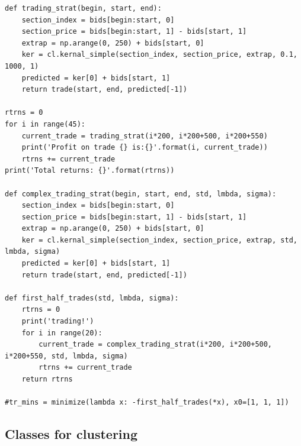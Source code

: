 \documentclass[a4paper]{article}
\begin{document}
\begin{verbatim}
def trading_strat(begin, start, end):
    section_index = bids[begin:start, 0]
    section_price = bids[begin:start, 1] - bids[start, 1]
    extrap = np.arange(0, 250) + bids[start, 0]
    ker = cl.kernal_simple(section_index, section_price, extrap, 0.1, 1000, 1)
    predicted = ker[0] + bids[start, 1]
    return trade(start, end, predicted[-1])

rtrns = 0
for i in range(45):
    current_trade = trading_strat(i*200, i*200+500, i*200+550)
    print('Profit on trade {} is:{}'.format(i, current_trade))
    rtrns += current_trade 
print('Total returns: {}'.format(rtrns))

def complex_trading_strat(begin, start, end, std, lmbda, sigma):
    section_index = bids[begin:start, 0]
    section_price = bids[begin:start, 1] - bids[start, 1]
    extrap = np.arange(0, 250) + bids[start, 0]
    ker = cl.kernal_simple(section_index, section_price, extrap, std, lmbda, sigma)
    predicted = ker[0] + bids[start, 1]
    return trade(start, end, predicted[-1])

def first_half_trades(std, lmbda, sigma):
    rtrns = 0
    print('trading!')
    for i in range(20):
        current_trade = complex_trading_strat(i*200, i*200+500, i*200+550, std, lmbda, sigma)
        rtrns += current_trade
    return rtrns

#tr_mins = minimize(lambda x: -first_half_trades(*x), x0=[1, 1, 1])
\end{verbatim}

\subsection*{Classes for clustering}
\end{document}
